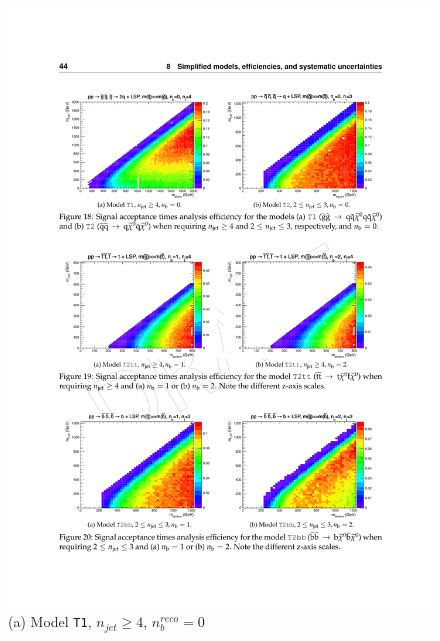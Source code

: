 \begin{figure}[ht]
\centering
\begin{minipage}[b]{0.45 \linewidth}
\includegraphics[width = 1.0\linewidth]{plots/t1_signal_eff.pdf}
\centering(a) Model \texttt{T1}, $n_{jet} \geq 4$, $n_{b}^{reco} = 0$ 
\end{minipage}
\quad
\begin{minipage}[b]{0.45\linewidth}

\end{minipage}
\end{figure}
